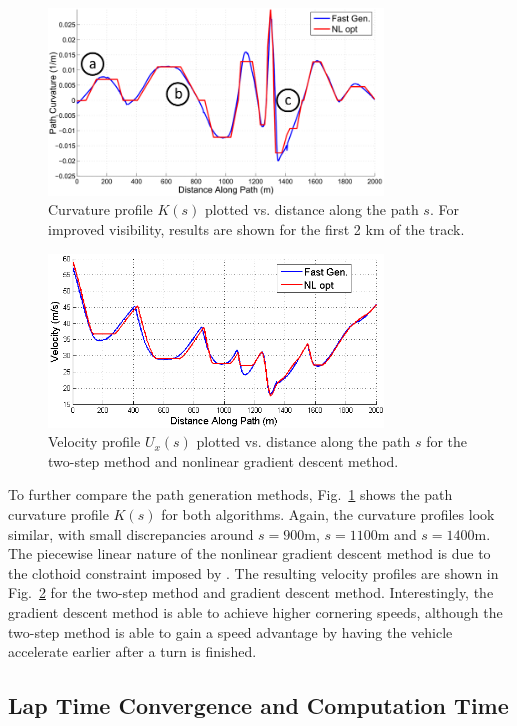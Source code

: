 \documentclass[twocolumn,10pt, final]{asme2e}
\begin{document}
\begin{figure}
\centering
\includegraphics[width=3.5in]{figures/curvatureprofiles.png}
\caption{Curvature profile $K(s)$ plotted vs. distance along the path $s$. For improved visibility, results
 are shown for the first 2 km of the track.}
\label{kProfiles}
\end{figure}

\begin{figure}
\centering
\includegraphics[width=3.5in]{figures/velocityProfiles.png}
\caption{Velocity profile $U_x(s)$ plotted vs. distance along the path $s$ for the two-step method and nonlinear
gradient descent method.}
\label{UxProfiles}
\end{figure}

To further compare the path generation methods, Fig.~\ref{kProfiles} shows the path curvature profile $K(s)$ for both algorithms.
Again, the curvature profiles look similar, with small discrepancies around $s = 900$m, $s = 1100$m and $s=1400$m. The piecewise linear nature of the 
nonlinear gradient descent method is due to the clothoid constraint imposed by \cite{theodosis}. The resulting velocity profiles are 
shown in Fig.~\ref{UxProfiles} for the two-step method and gradient descent method. Interestingly, the gradient descent method is able to achieve higher cornering speeds, although the two-step method
is able to gain a speed advantage by having the vehicle accelerate earlier after a turn is finished.    

\subsection*{Lap Time Convergence and Computation Time}
\end{document}
